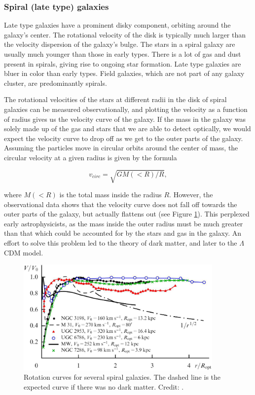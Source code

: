 \subsubsection{Spiral (late type) galaxies} \label{earlies}
Late type galaxies have a prominent disky component, orbiting around the galaxy's center. The rotational velocity of the disk is typically much larger than the velocity dispersion of the galaxy's bulge. The stars in a spiral galaxy are usually much younger than those in early types. There is a lot of gas and dust present in spirals, giving rise to ongoing star formation. Late type galaxies are bluer in color than early types. Field galaxies, which are not part of any galaxy cluster, are predominantly spirals. 


The rotational velocities of the stars at different radii in the disk of spiral galaxies can be measured observationally, and plotting the velocity as a function of radius gives us the velocity curve of the galaxy. If the mass in the galaxy was solely made up of the gas and stars that we are able to detect optically, we would expect the velocity curve to drop off as we get to the outer parts of the galaxy. Assuming the particles move in circular orbits around the center of mass, the circular velocity at a given radius is given by the formula

\begin{equation}
    v_{circ} = \sqrt{GM(<R)/R}, 
\end{equation}

where $M(<R)$ is the total mass inside the radius $R$. However, the observational data shows that the velocity curve does not fall off towards the outer parts of the galaxy, but actually flattens out (see Figure \ref{rotation_curves}). This perplexed early astrophysicists, as the mass inside the outer radius must be much greater than that which could be accounted for by the stars and gas in the galaxy. An effort to solve this problem led to the theory of dark matter, and later to the $\Lambda$CDM model.

\begin{figure}
    \centering
    \includegraphics[width=0.9\textwidth]{images/rotation_curves.png}
    \caption{Rotation curves for several spiral galaxies. The dashed line is the expected curve if there was no dark matter. Credit: \cite{Zasov2017}.}
    \label{rotation_curves}
\end{figure}

